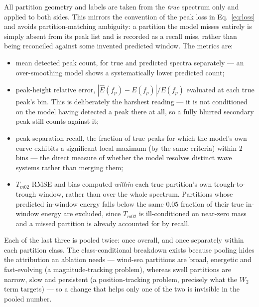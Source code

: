 All partition geometry and labels are taken from the \emph{true} spectrum only and applied to both sides. This mirrors the convention of the peak loss in Eq.~\eqref{eq:loss} and avoids partition-matching ambiguity: a partition the model misses entirely is simply absent from its peak list and is recorded as a recall miss, rather than being reconciled against some invented predicted window. The metrics are:
\begin{itemize}
  \item mean detected peak count, for true and predicted spectra separately — an over-smoothing model shows a systematically lower predicted count;
  \item peak-height relative error, $|\hat{E}(f_p) - E(f_p)|/E(f_p)$ evaluated at each true peak's bin. This is deliberately the harshest reading — it is not conditioned on the model having detected a peak there at all, so a fully blurred secondary peak still counts against it;
  \item peak-separation recall, the fraction of true peaks for which the model's own curve exhibits a significant local maximum (by the same criteria) within 2 bins — the direct measure of whether the model resolves distinct wave systems rather than merging them;
  \item $T_{m02}$ RMSE and bias computed \emph{within} each true partition's own trough-to-trough window, rather than over the whole spectrum. Partitions whose predicted in-window energy falls below the same $0.05$ fraction of their true in-window energy are excluded, since $T_{m02}$ is ill-conditioned on near-zero mass and a missed partition is already accounted for by recall.
\end{itemize}
Each of the last three is pooled twice: once overall, and once separately within each partition class. The class-conditional breakdown exists because pooling hides the attribution an ablation needs — wind-sea partitions are broad, energetic and fast-evolving (a magnitude-tracking problem), whereas swell partitions are narrow, slow and persistent (a position-tracking problem, precisely what the $W_2$ term targets) — so a change that helps only one of the two is invisible in the pooled number.

